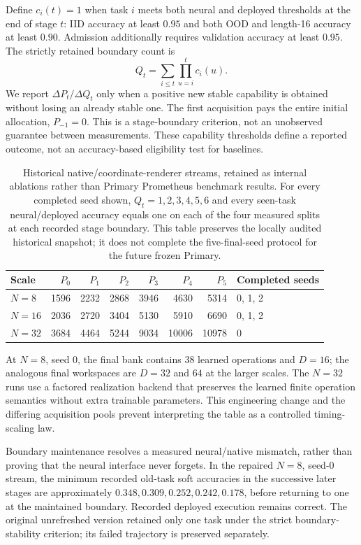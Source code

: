 Define $c_i(t)=1$ when task $i$ meets both neural and deployed thresholds at
the end of stage $t$: IID accuracy at least $0.95$ and both OOD and length-16
accuracy at least $0.90$. Admission additionally requires validation accuracy at
least $0.95$. The strictly retained boundary count is
\begin{equation}
 Q_t=\sum_{i\leq t}\prod_{u=i}^{t}c_i(u).
 \label{eq:boundary-retained-count}
\end{equation}
We report $\Delta P_t/\Delta Q_t$ only when a positive new stable capability
is obtained without losing an already stable one. The first acquisition pays
the entire initial allocation, $P_{-1}=0$. This is a stage-boundary criterion,
not an unobserved guarantee between measurements. These capability thresholds
define a reported outcome, not an accuracy-based eligibility test for baselines.

\begin{table}[t]
\centering
\small
\begin{tabular}{lrrrrrrl}
\toprule
Scale & $P_0$ & $P_1$ & $P_2$ & $P_3$ & $P_4$ & $P_5$ & Completed seeds\\
\midrule
$N=8$  & 1596 & 2232 & 2868 & 3946 & 4630 & 5314 & 0, 1, 2\\
$N=16$ & 2036 & 2720 & 3404 & 5130 & 5910 & 6690 & 0, 1, 2\\
$N=32$ & 3684 & 4464 & 5244 & 9034 &10006 &10978 & 0\\
\bottomrule
\end{tabular}
\caption{Historical native/coordinate-renderer streams, retained as internal
ablations rather than Primary Prometheus benchmark results. For every completed
seed shown, $Q_t=1,2,3,4,5,6$ and every seen-task neural/deployed accuracy equals
one on each of the four measured splits at each recorded stage boundary.
This table preserves the locally audited historical snapshot; it does not
complete the five-final-seed protocol for the future frozen Primary.}
\label{tab:growth-parameters}
\end{table}

At $N=8$, seed 0, the final bank contains 38 learned operations and $D=16$;
the analogous final workspaces are $D=32$ and $64$ at the larger scales.
The $N=32$ runs use a factored realization backend that preserves the learned
finite operation semantics without extra trainable parameters. This engineering
change and the differing acquisition pools prevent interpreting the table as
a controlled timing-scaling law.

Boundary maintenance resolves a measured neural/native mismatch, rather than
proving that the neural interface never forgets. In the repaired $N=8$, seed-0
stream, the minimum recorded old-task soft accuracies in the successive later
stages are approximately $0.348,0.309,0.252,0.242,0.178$, before returning to
one at the maintained boundary. Recorded deployed execution remains correct.
The original unrefreshed version retained only one task under the strict
boundary-stability criterion; its failed trajectory is preserved separately.

